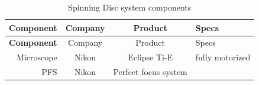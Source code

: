 \documentclass[11pt,singlespacinge,twoside]{reedthesis} %
\theoremstyle{definition}
\theoremstyle{definition}
\theoremstyle{definition}
\theoremstyle{remark}
\begin{document}
\begin{longtable}[]{@{}rccl@{}}
\caption{\label{tab:SDcomp} Spinning Disc system components}\tabularnewline
\toprule
\begin{minipage}[b]{0.20\columnwidth}\raggedleft
\textbf{Component}\strut
\end{minipage} & \begin{minipage}[b]{0.16\columnwidth}\centering
Company\strut
\end{minipage} & \begin{minipage}[b]{0.23\columnwidth}\centering
Product\strut
\end{minipage} & \begin{minipage}[b]{0.30\columnwidth}\raggedright
Specs\strut
\end{minipage}\tabularnewline
\midrule
\endfirsthead
\toprule
\begin{minipage}[b]{0.20\columnwidth}\raggedleft
\textbf{Component}\strut
\end{minipage} & \begin{minipage}[b]{0.16\columnwidth}\centering
Company\strut
\end{minipage} & \begin{minipage}[b]{0.23\columnwidth}\centering
Product\strut
\end{minipage} & \begin{minipage}[b]{0.30\columnwidth}\raggedright
Specs\strut
\end{minipage}\tabularnewline
\midrule
\endhead
\begin{minipage}[t]{0.20\columnwidth}\raggedleft
Microscope\strut
\end{minipage} & \begin{minipage}[t]{0.16\columnwidth}\centering
Nikon\strut
\end{minipage} & \begin{minipage}[t]{0.23\columnwidth}\centering
Eclipse Ti-E\strut
\end{minipage} & \begin{minipage}[t]{0.30\columnwidth}\raggedright
fully motorized\strut
\end{minipage}\tabularnewline
\begin{minipage}[t]{0.20\columnwidth}\raggedleft
PFS\strut
\end{minipage} & \begin{minipage}[t]{0.16\columnwidth}\centering
Nikon\strut
\end{minipage} & \begin{minipage}[t]{0.23\columnwidth}\centering
Perfect focus system\strut

\end{minipage}
\end{longtable}
\end{document}
